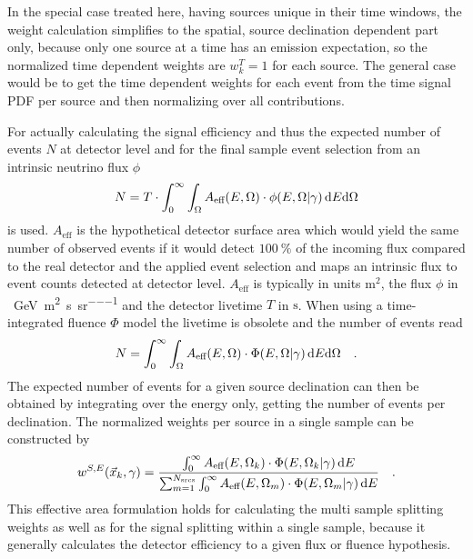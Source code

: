 In the special case treated here, having sources unique in their time windows, the weight calculation simplifies to the spatial, source declination dependent part only, because only one source at a time has an emission expectation, so the normalized time dependent weights are $w_k^T = 1$ for each source.
The general case would be to get the time dependent weights for each event from the time signal PDF per source and then normalizing over all contributions.

For actually calculating the signal efficiency and thus the expected number of events $N$ at detector level and for the final sample event selection from an intrinsic neutrino flux $\phi$
\begin{equation}
  N = T\cdot\int_0^\infty\int_\Omega
    A_\text{eff}(E,\Omega)\cdot\phi(E,\Omega | \gamma) \,\mathrm{d}E\mathrm{d}\Omega
\end{equation}
is used.
$A_\text{eff}$ is the hypothetical detector surface area which would yield the same number of observed events if it would detect $\SI{100}{\percent}$ of the incoming flux compared to the real detector and the applied event selection and maps an intrinsic flux to event counts detected at detector level.
$A_\text{eff}$ is typically in units $\si{\m\squared}$, the flux $\phi$ in \si{\per\GeV\per\m\squared\per\second\per\steradian} and the detector livetime $T$ in $\si{\second}$.
When using a time-integrated fluence $\Phi$ model the livetime is obsolete and the number of events read
\begin{equation}
  N = \int_0^\infty\int_\Omega
    A_\text{eff}(E,\Omega)\cdot\Phi(E,\Omega | \gamma) \,\mathrm{d}E\mathrm{d}\Omega
  \quad\text{.}
\end{equation}
The expected number of events for a given source declination can then be obtained by integrating over the energy only, getting the number of events per declination.
The normalized weights per source in a single sample can be constructed by
\begin{equation}
  w^{S,E}(\vec{x}_k, \gamma)
  = \frac
      {
        \int_0^\infty A_\text{eff}(E,\Omega_k) \cdot
        \Phi(E,\Omega_k | \gamma)\,\mathrm{d}E
      }
      {
        \sum_{m=1}^{N_\text{srcs}}
        \int_0^\infty A_\text{eff}(E,\Omega_m) \cdot
        \Phi(E,\Omega_m | \gamma)\,\mathrm{d}E
      }
  \quad\text{.}
\end{equation}
This effective area formulation holds for calculating the multi sample splitting weights as well as for the signal splitting within a single sample, because it generally calculates the detector efficiency to a given flux or fluence hypothesis.

